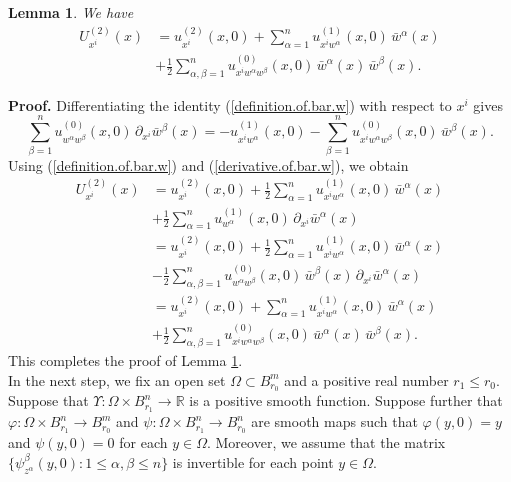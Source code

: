 \documentclass[11pt]{amsart}
\newtheorem{lemma}[theorem]{Lemma}
\theoremstyle{definition}
\begin{document}
\begin{lemma}
\label{derivative.of.U2}
We have 
\begin{align*}
U^{(2)}_{x^i}(x) 
&= u^{(2)}_{x^i}(x,0) + \sum_{\alpha=1}^n u^{(1)}_{x^i w^\alpha}(x,0) \, \bar{w}^\alpha(x) \\ 
&+ \frac{1}{2} \sum_{\alpha,\beta=1}^n u^{(0)}_{x^i w^\alpha w^\beta}(x,0) \, \bar{w}^\alpha(x) \, \bar{w}^\beta(x). 
\end{align*}
\end{lemma}

\textbf{Proof.}
Differentiating the identity (\ref{definition.of.bar.w}) with respect to $x^i$ gives 
\begin{equation} 
\label{derivative.of.bar.w}
\sum_{\beta=1}^n u^{(0)}_{w^\alpha w^\beta}(x,0) \, \partial_{x^i} \bar{w}^\beta(x) = -u^{(1)}_{x^i w^\alpha}(x,0) - \sum_{\beta=1}^n u^{(0)}_{x^i w^\alpha w^\beta}(x,0) \, \bar{w}^\beta(x). 
\end{equation}
Using (\ref{definition.of.bar.w}) and (\ref{derivative.of.bar.w}), we obtain 
\begin{align*}
U^{(2)}_{x^i}(x) 
&= u^{(2)}_{x^i}(x,0) + \frac{1}{2} \sum_{\alpha=1}^n u^{(1)}_{x^i w^\alpha}(x,0) \, \bar{w}^\alpha(x) \\ 
&+ \frac{1}{2} \sum_{\alpha=1}^n u^{(1)}_{w^\alpha}(x,0) \, \partial_{x^i} \bar{w}^\alpha(x) \\ 
&= u^{(2)}_{x^i}(x,0) + \frac{1}{2} \sum_{\alpha=1}^n u^{(1)}_{x^i w^\alpha}(x,0) \, \bar{w}^\alpha(x) \\ 
&- \frac{1}{2} \sum_{\alpha,\beta=1}^n u^{(0)}_{w^\alpha w^\beta}(x,0) \, \bar{w}^\beta(x) \, \partial_{x^i} \bar{w}^\alpha(x) \\ 
&= u^{(2)}_{x^i}(x,0) + \sum_{\alpha=1}^n u^{(1)}_{x^i w^\alpha}(x,0) \, \bar{w}^\alpha(x) \\ 
&+ \frac{1}{2} \sum_{\alpha,\beta=1}^n u^{(0)}_{x^i w^\alpha w^\beta}(x,0) \, \bar{w}^\alpha(x) \, \bar{w}^\beta(x). 
\end{align*}
This completes the proof of Lemma \ref{derivative.of.U2}. \\

In the next step, we fix an open set $\Omega \subset B_{r_0}^m$ and a positive real number $r_1 \leq r_0$. Suppose that $\Upsilon: \Omega \times B_{r_1}^n \to \mathbb{R}$ is a positive smooth function. Suppose further that $\varphi: \Omega \times B_{r_1}^n \to B_{r_0}^m$ and $\psi: \Omega \times B_{r_1}^n \to B_{r_0}^n$ are smooth maps such that $\varphi(y,0) = y$ and $\psi(y,0) = 0$ for each $y \in \Omega$. Moreover, we assume that the matrix $\{\psi^\beta_{z^\alpha}(y,0): 1 \leq \alpha,\beta \leq n\}$ is invertible for each point $y \in \Omega$. 
\end{document}
